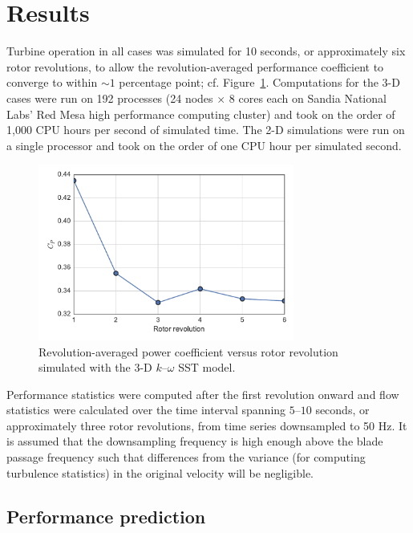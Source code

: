 \documentclass[aip,graphicx]{revtex4-1}
\begin{document}
\section{Results}

Turbine operation in all cases was simulated for 10 seconds, or approximately
six rotor revolutions, to allow the revolution-averaged performance coefficient
to converge to within $\sim 1$ percentage point; cf.
Figure~\ref{fig:cp-convergence}. Computations for the 3-D cases were run on 192
processes (24 nodes $\times$ 8 cores each on Sandia National Labs' Red Mesa high
performance computing cluster) and took on the order of 1,000 CPU hours per
second of simulated time. The 2-D simulations were run on a single processor and
took on the order of one CPU hour per simulated second.

\begin{figure}
    \centering

    \includegraphics[width=0.75\textwidth]{cp-time-series}

    \caption{Revolution-averaged power coefficient versus rotor revolution
    simulated with the 3-D $k$--$\omega$ SST model.}

    \label{fig:cp-convergence}
\end{figure}

Performance statistics were computed after the first revolution onward and flow
statistics were calculated over the time interval spanning $5$--$10$ seconds, or
approximately three rotor revolutions, from time series downsampled to 50 Hz. It
is assumed that the downsampling frequency is high enough above the blade
passage frequency such that differences from the variance (for computing
turbulence statistics) in the original velocity will be negligible.


\subsection{Performance prediction}
\end{document}
